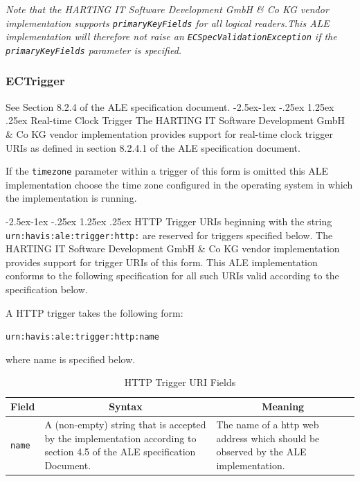 \documentclass[11pt,a4paper,oneside]{article}
\makeatletter
\renewcommand\paragraph{\@startsection{paragraph}{4}{\z@}%
            {-2.5ex\@plus -1ex \@minus -.25ex}%
            {1.25ex \@plus .25ex}%
            {\normalfont\normalsize\bfseries}}
\newenvironment{code}%
   {\snugshade\begin{internallinenumbers}}%
   {\end{internallinenumbers}\endsnugshade}
\newenvironment{code}
    {\HCode{<div class='code'><p>}}
    {\HCode{</p></div>}}
\makeatother
\begin{document}
\begin{code}
\emph{Note that the  HARTING IT Software Development GmbH \& Co KG  vendor implementation supports \texttt{primaryKeyFields} for all logical readers.This ALE implementation will therefore not raise an \texttt{ECSpecValidationException} if the \texttt{primaryKeyFields} parameter is specified.}
\end{code}

\subsubsection{ECTrigger}
\label{subsec:ECTrig}

See Section 8.2.4 of the ALE specification document.
\paragraph{Real-time Clock Trigger}
The HARTING IT Software Development GmbH \& Co KG  vendor implementation provides support for real-time clock trigger URIs as defined in section 8.2.4.1 of the ALE specification document.

If the \texttt{timezone} parameter within a trigger of this form is omitted this ALE implementation choose the time zone configured in the operating system in which the implementation is running.

\paragraph{HTTP Trigger}
URIs beginning with the string \texttt{urn:havis:ale:trigger:http:} are reserved for triggers specified below. The HARTING IT Software Development GmbH \& Co KG  vendor implementation provides support for trigger URIs of this form. This ALE implementation conforms to the following specification for all such URIs valid according to the specification below.

A HTTP trigger takes the following form:

\texttt{urn:havis:ale:trigger:http:name}

where name is specified below.

\begin{table}[!h]
\begin{tabularx}{\textwidth}{|l|X|X|}
\hline
\multicolumn{1}{|c|}{\textbf{Field}}&
\multicolumn{1}{c|}{\textbf{Syntax}}&
\multicolumn{1}{c|}{\textbf{Meaning}}\\
\hline
\texttt{name}&A (non-empty) string that is accepted by the implementation according to section 4.5 of the ALE specification Document.&The name of a http web address which should be observed by the ALE implementation. \\
\hline
\end {tabularx}
\caption{HTTP Trigger URI Fields}
\MakeLineNo
\end{table}
\FloatBarrier
\end{document}
